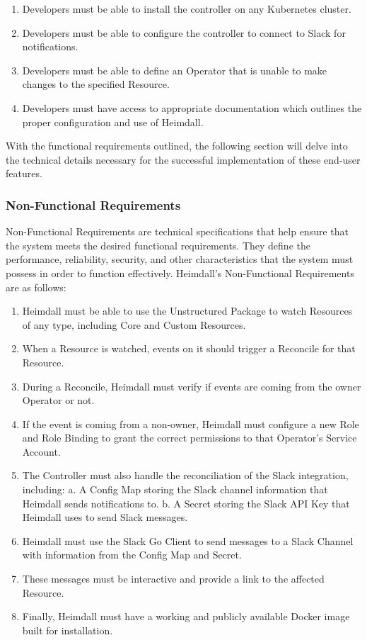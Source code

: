 \documentclass{article}
\begin{document}
\begin{enumerate}
    \itemsep0em
    \item Developers must be able to install the controller on any Kubernetes cluster.
    \item Developers must be able to configure the controller to connect to Slack for notifications.
    \item Developers must be able to define an Operator that is unable to make changes to the specified Resource.
    \item Developers must have access to appropriate documentation which outlines the proper configuration and use of Heimdall.
\end{enumerate}

With the functional requirements outlined, the following section will delve into the technical details necessary for the successful implementation of these end-user features.

\subsubsection{Non-Functional Requirements}

Non-Functional Requirements are technical specifications that help ensure that the system meets the desired functional requirements. They define the performance, reliability, security, and other characteristics that the system must possess in order to function effectively. Heimdall's Non-Functional Requirements are as follows:
\begin{enumerate}
    \itemsep0em
    \item Heimdall must be able to use the Unstructured Package to watch Resources of any type, including Core and Custom Resources.
    \item When a Resource is watched, events on it should trigger a Reconcile for that Resource.
    \item During a Reconcile, Heimdall must verify if events are coming from the owner Operator or not.
    \item If the event is coming from a non-owner, Heimdall must configure a new Role and Role Binding to grant the correct permissions to that Operator's Service Account.
    \item The Controller must also handle the reconciliation of the Slack integration, including:
    \subitem a. A Config Map storing the Slack channel information that Heimdall sends notifications to.
    \subitem b. A Secret storing the Slack API Key that Heimdall uses to send Slack messages.
    \item Heimdall must use the Slack Go Client to send messages to a Slack Channel with information from the Config Map and Secret.
    \item These messages must be interactive and provide a link to the affected Resource.
    \item Finally, Heimdall must have a working and publicly available Docker image built for installation.
\end{enumerate}
\end{document}

